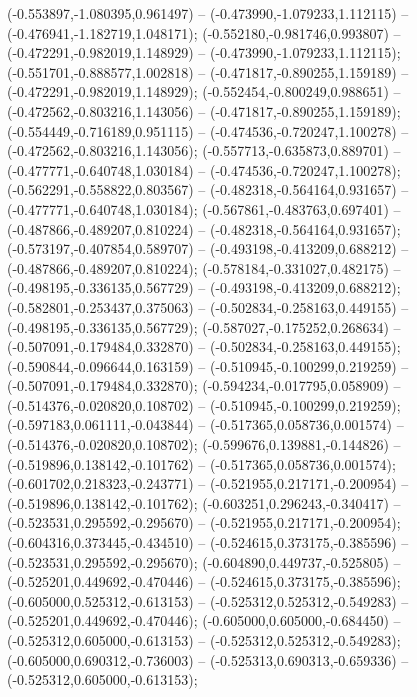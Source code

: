  (-0.553897,-1.080395,0.961497) -- (-0.473990,-1.079233,1.112115) -- (-0.476941,-1.182719,1.048171);
 (-0.552180,-0.981746,0.993807) -- (-0.472291,-0.982019,1.148929) -- (-0.473990,-1.079233,1.112115);
 (-0.551701,-0.888577,1.002818) -- (-0.471817,-0.890255,1.159189) -- (-0.472291,-0.982019,1.148929);
 (-0.552454,-0.800249,0.988651) -- (-0.472562,-0.803216,1.143056) -- (-0.471817,-0.890255,1.159189);
 (-0.554449,-0.716189,0.951115) -- (-0.474536,-0.720247,1.100278) -- (-0.472562,-0.803216,1.143056);
 (-0.557713,-0.635873,0.889701) -- (-0.477771,-0.640748,1.030184) -- (-0.474536,-0.720247,1.100278);
 (-0.562291,-0.558822,0.803567) -- (-0.482318,-0.564164,0.931657) -- (-0.477771,-0.640748,1.030184);
 (-0.567861,-0.483763,0.697401) -- (-0.487866,-0.489207,0.810224) -- (-0.482318,-0.564164,0.931657);
 (-0.573197,-0.407854,0.589707) -- (-0.493198,-0.413209,0.688212) -- (-0.487866,-0.489207,0.810224);
 (-0.578184,-0.331027,0.482175) -- (-0.498195,-0.336135,0.567729) -- (-0.493198,-0.413209,0.688212);
 (-0.582801,-0.253437,0.375063) -- (-0.502834,-0.258163,0.449155) -- (-0.498195,-0.336135,0.567729);
 (-0.587027,-0.175252,0.268634) -- (-0.507091,-0.179484,0.332870) -- (-0.502834,-0.258163,0.449155);
 (-0.590844,-0.096644,0.163159) -- (-0.510945,-0.100299,0.219259) -- (-0.507091,-0.179484,0.332870);
 (-0.594234,-0.017795,0.058909) -- (-0.514376,-0.020820,0.108702) -- (-0.510945,-0.100299,0.219259);
 (-0.597183,0.061111,-0.043844) -- (-0.517365,0.058736,0.001574) -- (-0.514376,-0.020820,0.108702);
 (-0.599676,0.139881,-0.144826) -- (-0.519896,0.138142,-0.101762) -- (-0.517365,0.058736,0.001574);
 (-0.601702,0.218323,-0.243771) -- (-0.521955,0.217171,-0.200954) -- (-0.519896,0.138142,-0.101762);
 (-0.603251,0.296243,-0.340417) -- (-0.523531,0.295592,-0.295670) -- (-0.521955,0.217171,-0.200954);
 (-0.604316,0.373445,-0.434510) -- (-0.524615,0.373175,-0.385596) -- (-0.523531,0.295592,-0.295670);
 (-0.604890,0.449737,-0.525805) -- (-0.525201,0.449692,-0.470446) -- (-0.524615,0.373175,-0.385596);
 (-0.605000,0.525312,-0.613153) -- (-0.525312,0.525312,-0.549283) -- (-0.525201,0.449692,-0.470446);
 (-0.605000,0.605000,-0.684450) -- (-0.525312,0.605000,-0.613153) -- (-0.525312,0.525312,-0.549283);
 (-0.605000,0.690312,-0.736003) -- (-0.525313,0.690313,-0.659336) -- (-0.525312,0.605000,-0.613153);
